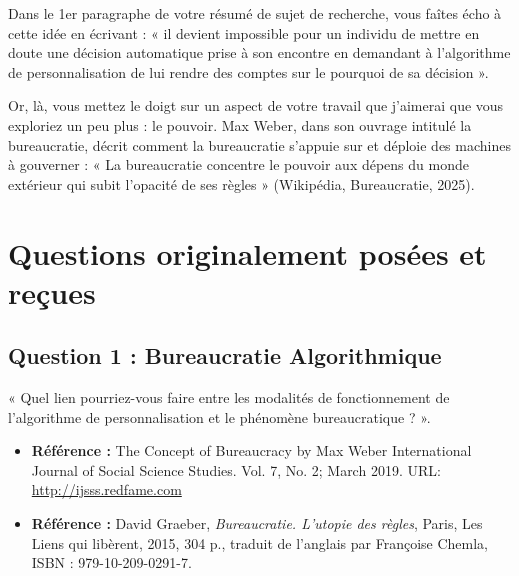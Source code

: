 Dans le 1er paragraphe de votre résumé de sujet de recherche, vous faîtes écho à cette idée en écrivant : « il devient impossible pour un individu de mettre en doute une décision automatique prise à son encontre en demandant à l’algorithme de personnalisation de lui rendre des comptes sur le pourquoi de sa décision ».

Or, là, vous mettez le doigt sur un aspect de votre travail que j’aimerai que vous exploriez un peu plus : le pouvoir. Max Weber, dans son ouvrage intitulé la bureaucratie, décrit comment la bureaucratie s’appuie sur et déploie des machines à gouverner : « La bureaucratie concentre le pouvoir aux dépens du monde extérieur qui subit l’opacité de ses règles » (Wikipédia, Bureaucratie, 2025).
\section{Questions originalement posées et reçues}

\subsection{Question 1 : Bureaucratie Algorithmique}
\label{annexe:question1}
« Quel lien pourriez-vous faire entre les modalités de fonctionnement de l’algorithme de personnalisation et le phénomène bureaucratique ? ».
\begin{itemize}
    \item \textbf{Référence :} The Concept of Bureaucracy by Max Weber International Journal of Social Science Studies. Vol. 7, No. 2; March 2019. URL: \url{http://ijsss.redfame.com}
    \item \textbf{Référence :} David Graeber, \textit{Bureaucratie. L'utopie des règles}, Paris, Les Liens qui libèrent, 2015, 304 p., traduit de l'anglais par Françoise Chemla, ISBN : 979-10-209-0291-7.
\end{itemize}

